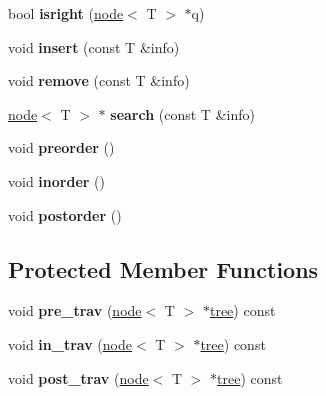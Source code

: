 \begin{DoxyCompactItemize}
\item 
\hypertarget{classtree_a019e3bc9e43d2b8dd03c1e898c1e84c9}{bool {\bfseries isright} (\hyperlink{structnode}{node}$<$ \-T $>$ $\ast$q)}\label{classtree_a019e3bc9e43d2b8dd03c1e898c1e84c9}

\item 
\hypertarget{classtree_a8e3922191b4cc78839cdfa0624414d02}{void {\bfseries insert} (const \-T \&info)}\label{classtree_a8e3922191b4cc78839cdfa0624414d02}

\item 
\hypertarget{classtree_ae97a1abcfbfcfdbac67235d440f86859}{void {\bfseries remove} (const \-T \&info)}\label{classtree_ae97a1abcfbfcfdbac67235d440f86859}

\item 
\hypertarget{classtree_aba91e6eaf1cca3fab90c08178972ab95}{\hyperlink{structnode}{node}$<$ \-T $>$ $\ast$ {\bfseries search} (const \-T \&info)}\label{classtree_aba91e6eaf1cca3fab90c08178972ab95}

\item 
\hypertarget{classtree_a2b81298f3719c31ecc40eaa7d9b0fb3a}{void {\bfseries preorder} ()}\label{classtree_a2b81298f3719c31ecc40eaa7d9b0fb3a}

\item 
\hypertarget{classtree_a040e5216cf50a55e93a303c9fe24416c}{void {\bfseries inorder} ()}\label{classtree_a040e5216cf50a55e93a303c9fe24416c}

\item 
\hypertarget{classtree_a57f71b9e0c38d77ecfdebcd87187dba3}{void {\bfseries postorder} ()}\label{classtree_a57f71b9e0c38d77ecfdebcd87187dba3}

\end{DoxyCompactItemize}
\subsection*{\-Protected \-Member \-Functions}
\begin{DoxyCompactItemize}
\item 
\hypertarget{classtree_a7db3000ea2f566cf4a2ea4a08c934d3c}{void {\bfseries pre\-\_\-trav} (\hyperlink{structnode}{node}$<$ \-T $>$ $\ast$\hyperlink{classtree}{tree}) const }\label{classtree_a7db3000ea2f566cf4a2ea4a08c934d3c}

\item 
\hypertarget{classtree_afa41aa526d4c077fefd1bb6a4f948536}{void {\bfseries in\-\_\-trav} (\hyperlink{structnode}{node}$<$ \-T $>$ $\ast$\hyperlink{classtree}{tree}) const }\label{classtree_afa41aa526d4c077fefd1bb6a4f948536}

\item 
\hypertarget{classtree_a8ba89838a89104f576ab8bbff5309b77}{void {\bfseries post\-\_\-trav} (\hyperlink{structnode}{node}$<$ \-T $>$ $\ast$\hyperlink{classtree}{tree}) const }\label{classtree_a8ba89838a89104f576ab8bbff5309b77}

\end{DoxyCompactItemize}
